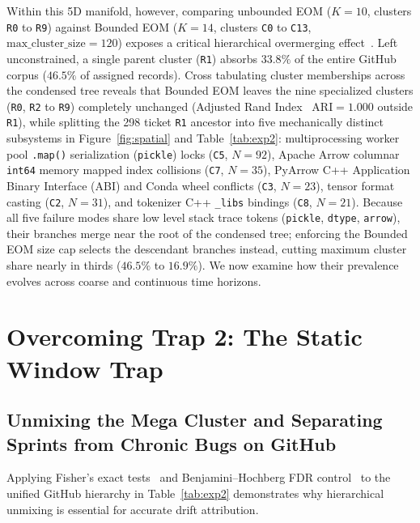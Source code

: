 \documentclass[sigconf,nonacm,pbalance]{acmart}
\begin{document}
Within this 5D manifold, however, comparing unbounded EOM ($K = 10$, clusters \texttt{R0} to \texttt{R9}) against Bounded EOM ($K = 14$, clusters \texttt{C0} to \texttt{C13}, $\text{max\_cluster\_size} = 120$) exposes a critical hierarchical overmerging effect~\cite{campello2013density, lhoest2021datasets}. Left unconstrained, a single parent cluster (\texttt{R1}) absorbs $33.8\%$ of the entire GitHub corpus ($46.5\%$ of assigned records). Cross tabulating cluster memberships across the condensed tree reveals that Bounded EOM leaves the nine specialized clusters (\texttt{R0}, \texttt{R2} to \texttt{R9}) completely unchanged (Adjusted Rand Index~\cite{hubert1985comparing} $\text{ARI} = 1.000$ outside \texttt{R1}), while splitting the 298 ticket \texttt{R1} ancestor into five mechanically distinct subsystems in Figure~\ref{fig:spatial} and Table~\ref{tab:exp2}: multiprocessing worker pool \texttt{.map()} serialization (\texttt{pickle}) locks (\texttt{C5}, $N = 92$), Apache Arrow columnar \texttt{int64} memory mapped index collisions (\texttt{C7}, $N = 35$), PyArrow C++ Application Binary Interface (ABI) and Conda wheel conflicts (\texttt{C3}, $N = 23$), tensor format casting (\texttt{C2}, $N = 31$), and tokenizer C++ \texttt{\_libs} bindings (\texttt{C8}, $N = 21$). Because all five failure modes share low level stack trace tokens (\texttt{pickle}, \texttt{dtype}, \texttt{arrow}), their branches merge near the root of the condensed tree; enforcing the Bounded EOM size cap selects the descendant branches instead, cutting maximum cluster share nearly in thirds ($46.5\%$ to $16.9\%$). We now examine how their prevalence evolves across coarse and continuous time horizons.

\section{Overcoming Trap 2: The Static Window Trap}

\subsection{Unmixing the Mega Cluster and Separating Sprints from Chronic Bugs on GitHub}
Applying Fisher's exact tests~\cite{fisher1922interpretation} and Benjamini--Hochberg FDR control~\cite{benjamini1995controlling} to the unified GitHub hierarchy in Table~\ref{tab:exp2} demonstrates why hierarchical unmixing is essential for accurate drift attribution.
\end{document}
